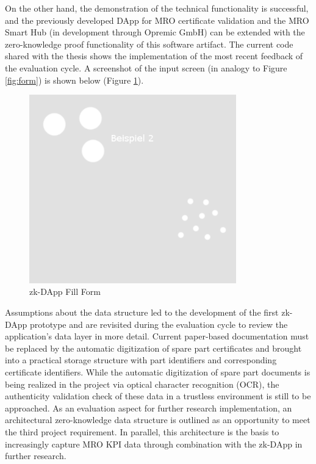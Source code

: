 On the other hand, the demonstration of the technical functionality is successful, and the previously developed DApp for MRO certificate validation and the MRO Smart Hub (in development through Opremic GmbH) can be extended with the zero-knowledge proof functionality of this software artifact. The current code shared with the thesis shows the implementation of the most recent feedback of the evaluation cycle. A screenshot of the input screen (in analogy to Figure \ref{fig:form}) is shown below (Figure \ref{fig:form1}).
\begin{figure}[hbt]
	\centering
		\includegraphics[width=0.8\textwidth]{Pictures/bsp2.png}
	\caption{zk-DApp Fill Form}
	\label{fig:form1}
\end{figure}
Assumptions about the data structure led to the development of the first zk-DApp prototype and are revisited during the evaluation cycle to review the application's data layer in more detail. Current paper-based documentation must be replaced by the automatic digitization of spare part certificates and brought into a practical storage structure with part identifiers and corresponding certificate identifiers. While the automatic digitization of spare part documents is being realized in the project via optical character recognition (OCR), the authenticity validation check of these data in a trustless environment is still to be approached. As an evaluation aspect for further research implementation, an architectural zero-knowledge data structure is outlined as an opportunity to meet the third project requirement. In parallel, this architecture is the basis to increasingly capture MRO KPI data through combination with the zk-DApp in further research. 

